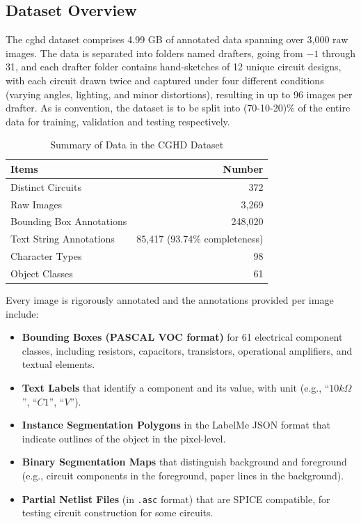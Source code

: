 \subsection{Dataset Overview}

The \gls{cghd} dataset comprises 4.99 GB of annotated data spanning over 3,000 raw images. The data is separated into folders named drafters, going from $-1$ through 31, and each drafter folder contains hand-sketches of 12 unique circuit designs, with each circuit drawn twice and captured under four different conditions (varying angles, lighting, and minor distortions), resulting in up to 96 images per drafter. As is convention, the dataset is to be split into (70-10-20)\% of the entire data for training, validation and testing respectively.

\begin{table}[H]
    \centering
    \caption{Summary of Data in the CGHD Dataset}
    \label{table:cghd-summary}
    \begin{tabular}{lr}
        \toprule
        \textbf{Items} & \textbf{Number} \\
        \midrule
        Distinct Circuits & 372 \\
        Raw Images & 3,269 \\
        Bounding Box Annotations & 248,020 \\
        Text String Annotations & 85,417 (93.74\% completeness) \\
        Character Types & 98 \\
        Object Classes & 61 \\
        \bottomrule
    \end{tabular}
\end{table}

Every image is rigorously annotated and the annotations provided per image include:

\begin{itemize}
    \item \textbf{Bounding Boxes (PASCAL VOC format)} for 61 electrical component classes, including resistors, capacitors, transistors, operational amplifiers, and textual elements.
    
    \item \textbf{Text Labels} that identify a component and its value, with unit (e.g., ``$10k\Omega$'', ``$C1$'', ``$V$'').
    
    \item \textbf{Instance Segmentation Polygons} in the LabelMe JSON format that indicate outlines of the object in the pixel-level.
    
    \item \textbf{Binary Segmentation Maps} that distinguish background and foreground (e.g., circuit components in the foreground, paper lines in the background).
    
    \item \textbf{Partial Netlist Files} (in \texttt{.asc} format) that are SPICE compatible, for testing circuit construction for some circuits.
\end{itemize}

